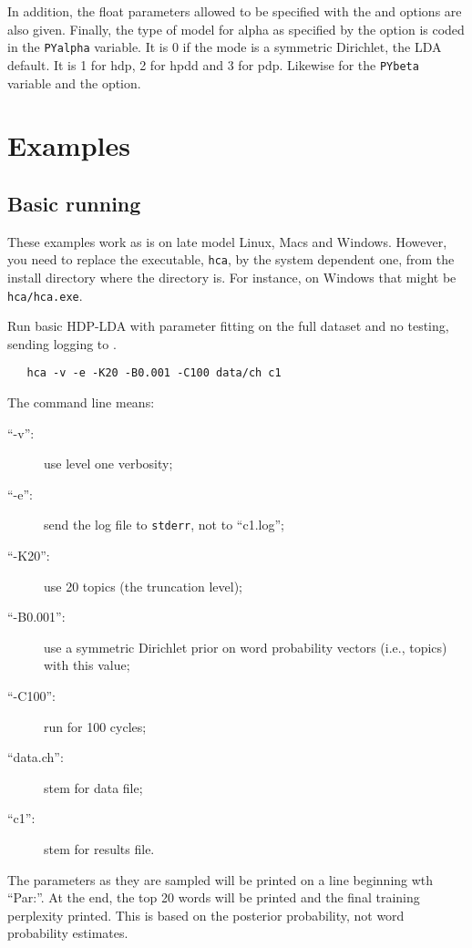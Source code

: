 \documentclass[a4paper,english]{article}
\begin{document}
In addition, the float parameters allowed to be specified with the
 and  options are also given.
Finally, the type of model for alpha as specified by the
 option is coded in the
\texttt{PYalpha} variable. 
It is 0 if the mode is a symmetric Dirichlet,
the LDA default.
It is 1 for hdp, 2 for hpdd and 3 for pdp.
Likewise for the \texttt{PYbeta} variable and the  option.

\section{Examples}

\subsection{Basic running}

These examples work as is on late model Linux, Macs and Windows.
However, you need to replace the executable,
\texttt{hca}, by the system dependent one,
from the install directory where the  directory is.
For instance, on Windows that might be \texttt{hca/hca.exe}.

Run basic HDP-LDA with parameter fitting on the full dataset and no testing,
sending logging to .
\begin{verbatim}
   hca -v -e -K20 -B0.001 -C100 data/ch c1
\end{verbatim}
The command line means:
\begin{description}
\item[``-v'':] use level one verbosity;
\item[``-e'':] send the log file to  \texttt{stderr},
not to ``c1.log'';
\item[``-K20'':] use 20 topics (the truncation level);
\item[``-B0.001'':]  use a symmetric Dirichlet prior on word probability
vectors (i.e., topics) with this value;
\item[``-C100'':] run for 100 cycles;
\item[``data.ch'':] stem for data file;
\item[``c1'':] stem for results file.
\end{description}
The parameters as they are sampled will be
printed on a line beginning wth ``Par:''.
At the end, the top 20 words will be printed and the
final training perplexity printed.  This is based on
the posterior probability, not word probability
estimates.
\end{document}
